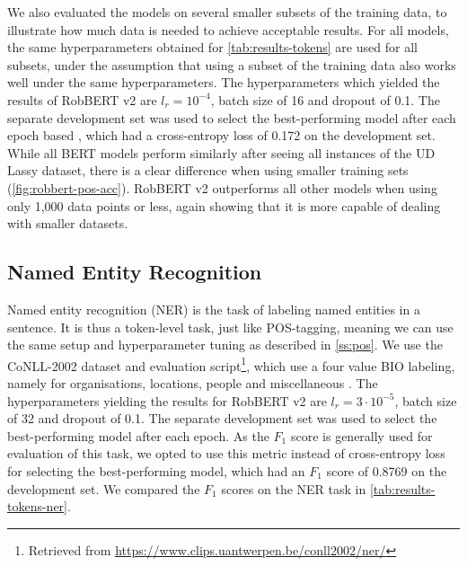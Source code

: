 \documentclass[11pt,a4paper]{article}
\begin{document}
We also evaluated the models on several smaller subsets of the training data, to illustrate how much data is needed to achieve acceptable results.
For all models, the same hyperparameters obtained for \autoref{tab:results-tokens} are used for all subsets, under the assumption that using a subset of the training data also works well under the same hyperparameters.
The hyperparameters which yielded the results of RobBERT v2 are $l_r=10^{-4}$, batch size of 16 and dropout of 0.1.
The separate development set was used to select the best-performing model after each epoch based , which had a cross-entropy loss of 0.172 on the development set.
While all BERT models perform similarly after seeing all instances of the UD Lassy dataset, there is a clear difference when using smaller training sets (\autoref{fig:robbert-pos-acc}).
RobBERT v2 outperforms all other models when using only 1,000 data points or less, again showing that it is more capable of dealing with smaller datasets.





\subsection{Named Entity Recognition}

Named entity recognition (NER) is the task of labeling named entities in a sentence.
It is thus a token-level task, just like POS-tagging, meaning we can use the same setup and hyperparameter tuning as described in \autoref{ss:pos}.
We use the CoNLL-2002 dataset and evaluation script\footnote{Retrieved from \url{https://www.clips.uantwerpen.be/conll2002/ner/}}, which use a four value BIO labeling, namely for organisations, locations, people and miscellaneous \citep{sang2002conll}.
The hyperparameters yielding the results for RobBERT v2 are $l_r=3\cdot10^{-5}$, batch size of 32 and dropout of 0.1.
The separate development set was used to select the best-performing model after each epoch.
As the $F_1$ score is generally used for evaluation of this task, we opted to use this metric instead of cross-entropy loss for selecting the best-performing model, which had an $F_1$ score of 0.8769 on the development set.
We compared the $F_1$ scores on the NER task in \autoref{tab:results-tokens-ner}.
\end{document}
